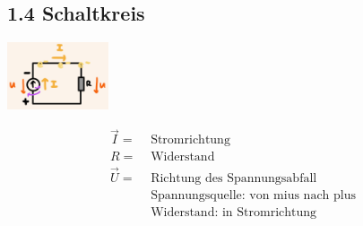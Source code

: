 \subsection*{1.4 Schaltkreis}
\vspace{-1mm}
\begin{minipage}{0.49\linewidth}
    \begin{footnotesize}
        \begin{center}
            \vspace{2mm}
            \includegraphics[width = 30mm]{src/images/schaltkreis.png}
        \end{center}
    \end{footnotesize}
\end{minipage}
\begin{minipage}{0.5\linewidth}
    \begin{scriptsize}
        \begin{center}
            \begin{align*}
                \overrightarrow{I} = &\text{ Stromrichtung}
                \\R = &\text{ Widerstand} 
                \\\overrightarrow{U} = &\text{ Richtung des Spannungsabfall}
                \\&\text{ Spannungsquelle: von mius nach plus}
                \\&\text{ Widerstand: in Stromrichtung}
            \end{align*}
        \end{center}
    \end{scriptsize}
\end{minipage}
\vspace{1mm}

